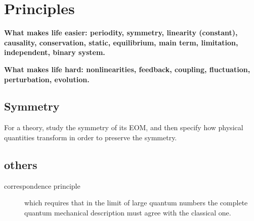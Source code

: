 \section{Principles}
\textbf{What makes life easier: periodity, symmetry, linearity (constant), causality, conservation, static, equilibrium, main term, limitation, independent, binary system.}

\textbf{What makes life hard: nonlinearities, feedback, coupling, 
fluctuation, perturbation, evolution.}

\subsection{Symmetry}
For a theory, study the symmetry of its EOM, and then specify how physical quantities transform 
in order to preserve the symmetry.




\subsection{others}
\begin{description}
    \item[correspondence principle]
	which requires that in the limit of large quantum numbers the 
	complete quantum mechanical description must agree with the 
	classical one.
\end{description}
